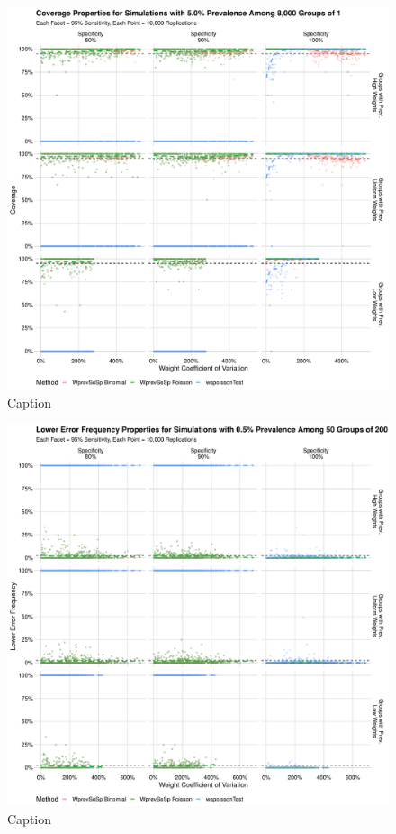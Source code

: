 \documentclass[AMA,STIX1COL]{WileyNJD-v2}
\begin{document}
\begin{figure}
\centering
\includegraphics[width=\textwidth]{figures/imperfect_coverage_8000_groups_0_05_prev.pdf}
\caption{Caption}
\label{fig:imperfect_coverage_8000_groups_0_05_prev}
\end{figure}

\begin{figure}
\centering
\includegraphics[width=\textwidth]{figures/imperfect_lower_error_frequency_50_groups_0_005_prev.pdf}
\caption{Caption}
\label{fig:imperfect_lower_error_frequency_50_groups_0_005_prev}
\end{figure}
\end{document}
